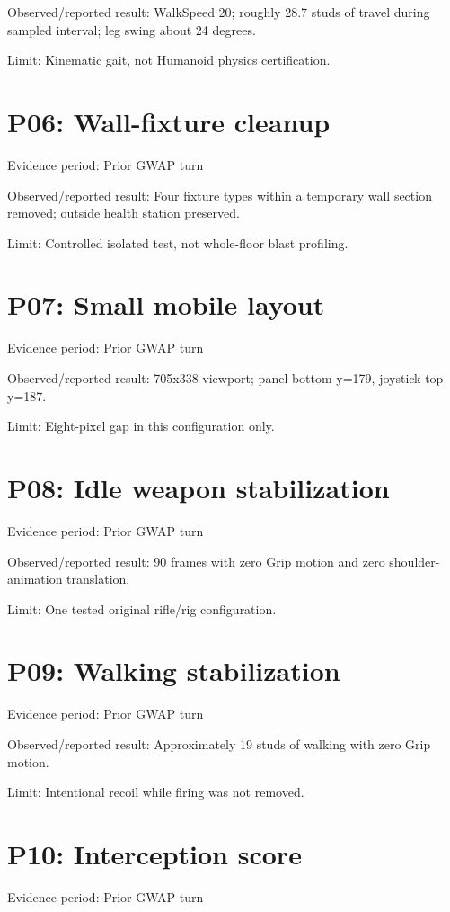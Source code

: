 Observed/\allowbreak{}reported result: WalkSpeed 20; roughly 28.\allowbreak{}7 studs of travel during sampled interval; leg swing about 24 degrees.\allowbreak{}

Limit: Kinematic gait, not Humanoid physics certification.\allowbreak{}

\section{P06: Wall-fixture cleanup}
Evidence period: Prior GWAP turn

Observed/\allowbreak{}reported result: Four fixture types within a temporary wall section removed; outside health station preserved.\allowbreak{}

Limit: Controlled isolated test, not whole-floor blast profiling.\allowbreak{}

\section{P07: Small mobile layout}
Evidence period: Prior GWAP turn

Observed/\allowbreak{}reported result: 705x338 viewport; panel bottom y=179, joystick top y=187.\allowbreak{}

Limit: Eight-pixel gap in this configuration only.\allowbreak{}

\section{P08: Idle weapon stabilization}
Evidence period: Prior GWAP turn

Observed/\allowbreak{}reported result: 90 frames with zero Grip motion and zero shoulder-animation translation.\allowbreak{}

Limit: One tested original rifle/\allowbreak{}rig configuration.\allowbreak{}

\section{P09: Walking stabilization}
Evidence period: Prior GWAP turn

Observed/\allowbreak{}reported result: Approximately 19 studs of walking with zero Grip motion.\allowbreak{}

Limit: Intentional recoil while firing was not removed.\allowbreak{}

\section{P10: Interception score}
Evidence period: Prior GWAP turn

